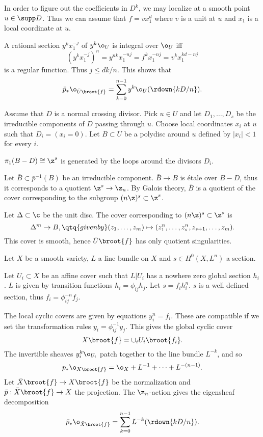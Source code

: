 In order to figure out the coefficients in $D^k$, we may localize at a smooth
point
$u\in\supp D$. Thus we can assume that $f=vx_1^d$ where $v$ is a unit at
$u$ and $x_1$ is a local coordinate at $u$. 

A rational section $y^kx_1^{-j}$ of $y^k\o_U$ is integral over $\o_U$ iff
$$
(y^kx_1^{-j})^n=y^{nk}x_1^{-nj}=f^kx_1^{-nj}=v^kx_1^{kd-nj}
$$
 is a regular function. Thus $j\leq dk/n$. This shows that
$$
\bar p_*\o_{\bar U\broot{f}}=\sum_{k=0}^{n-1}y^k\o_U(\rdown{kD/n}).
$$
\enddemo


Assume that $D$ is a normal crossing divisor. Pick $u\in U$ and let 
$D_1,\dots,D_s$ be the irreducible components of $D$ passing through $u$. 
Choose local  coordinates $x_i$ at $u$ such that
$D_i=(x_i=0)$. Let  $B\subset
U$ be a polydisc around $u$ defined by $|x_i|<1$ for every $i$. 

$\pi_1(B-D)\cong \z^s$ is generated by the loops around the
divisors $D_i$. 

Let $\bar B\subset \bar p^{-1}(B)$ be an irreducible component. 
$\bar B\to B$ is \'etale over $B-D$, thus  it corresponds to
a  quotient  $\z^s\to \z_n$. 
 By Galois theory,  $\bar B$ is a quotient of the
cover corresponding to the subgroup $(n\z)^s\subset \z^s$.

Let $\Delta\subset \c$ be the unit disc. The cover
corresponding to  $(n\z)^s\subset \z^s$ is
$$
\Delta^m\to B,\qtq{given by} (z_1,\dots,z_m)\mapsto
(z_1^n,\dots,z_s^n,z_{s+1},\dots,z_m).
$$
 This cover is
smooth, hence $\bar U\broot{f}$ has only quotient singularities.
\enddemo



Let $X$ be a smooth variety, $L$  a line bundle on $X$ and $s\in H^0(X,L^n)$
a section.

Let $U_i\subset X$ be an affine cover such that  $L|U_i$ has a nowhere zero
global section $h_i$. $L$ is given by transition functions $h_i=\phi_{ij}h_j$.
Let $s=f_ih_i^n$. $s$ is a well defined section, thus
$f_i=\phi_{ij}^{-n}f_j$.

The local cyclic covers are given by equations $y_i^n=f_i$. These are
compatible if we set the transformation rules $y_i=\phi_{ij}^{-1}y_j$.
This gives the global cyclic cover
$$
 X\broot{f}=\cup_i  U_i\broot{f_i}.
$$
The invertible sheaves $y_i^k\o_{U_i}$  patch together to the line
bundle $L^{-k}$, and so
$$
p_*\o_{X\broot{f}}=\o_X+L^{-1}+\dots+L^{-(n-1)}.
$$
Let $\bar X\broot{f}\to X\broot{f}$ be the normalization and $\bar p:\bar
X\broot{f}\to X$ the projection. The $\z_n$-action gives the eigensheaf
decomposition
$$
\bar p_*\o_{\bar X\broot{f}}=\sum_{k=0}^{n-1}L^{-k}(\rdown{kD/n}).
$$
\enddemo

